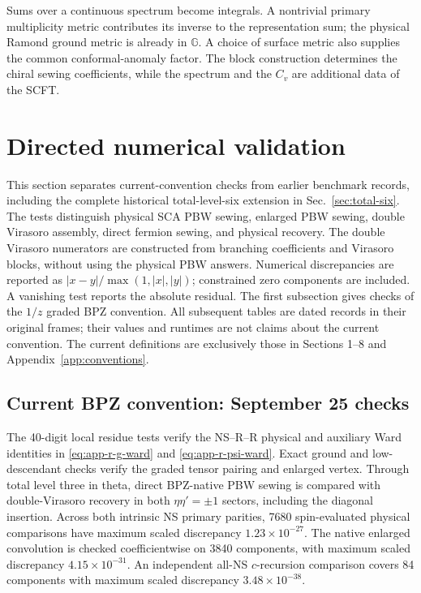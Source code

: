 \documentclass[11pt]{article}
\numberwithin{equation}{section}
\begin{document}
Sums over a continuous spectrum become integrals. A nontrivial primary
multiplicity metric contributes its inverse to the representation sum;
the physical Ramond ground metric is already in $\mathbb G$. A choice
of surface metric also supplies the common conformal-anomaly factor.
The block construction determines the chiral sewing coefficients, while
the spectrum and the $C_v$ are additional data of the SCFT.

\section{Directed numerical validation}
\label{sec:validation}

This section separates current-convention checks from earlier
benchmark records, including the complete historical total-level-six
extension in Sec.~\ref{sec:total-six}. The tests distinguish
physical SCA PBW sewing, enlarged PBW sewing,
double Virasoro assembly, direct fermion sewing, and physical recovery.
The double Virasoro numerators are constructed from branching coefficients
and Virasoro blocks, without using the physical PBW answers. Numerical
discrepancies are reported as $|x-y|/\max(1,|x|,|y|)$; constrained zero
components are included. A vanishing test reports the absolute residual.
The first subsection gives checks of the $1/z$ graded BPZ convention.
All subsequent tables are dated records in their original frames;
their values and runtimes are not claims about the current convention.
The current definitions are exclusively those in Sections 1--8 and
Appendix~\ref{app:conventions}.

\subsection{Current BPZ convention: September 25 checks}

The 40-digit local residue tests verify the NS--R--R physical and
auxiliary Ward identities in \eqref{eq:app-r-g-ward} and
\eqref{eq:app-r-psi-ward}. Exact ground and low-descendant checks
verify the graded tensor pairing and enlarged vertex. Through
total level three in theta, direct BPZ-native PBW sewing is
compared with double-Virasoro recovery in both
$\eta\eta'=\pm1$ sectors, including the diagonal insertion.
Across both intrinsic NS primary parities, 7680 spin-evaluated
physical comparisons have maximum scaled discrepancy
$1.23\times10^{-27}$. The native enlarged convolution is
checked coefficientwise on 3840 components, with maximum scaled
discrepancy $4.15\times10^{-31}$. An independent all-NS
$c$-recursion comparison covers 84 components with maximum
scaled discrepancy $3.48\times10^{-38}$.
\end{document}

